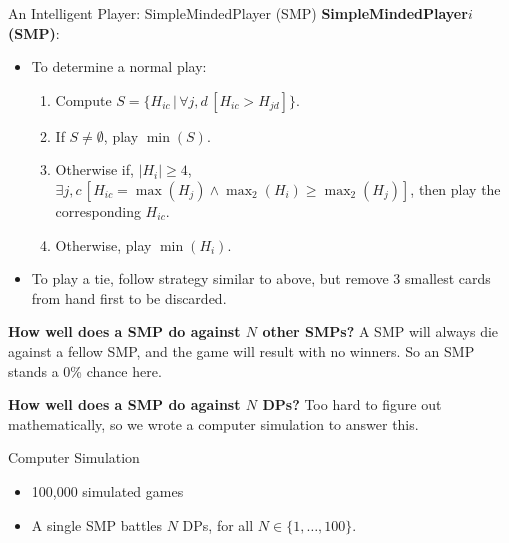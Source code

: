 \documentclass{slides}
\let\geq=\geqslant
\begin{document}
\begin{frame}{An Intelligent Player: SimpleMindedPlayer (SMP)}
    \textbf{SimpleMindedPlayer$i$ (SMP)}:
    \begin{itemize}
        \item To determine a normal play:
            \begin{enumerate}
                \item Compute $S = \{H_{ic} \,|\, \forall j,d\, [H_{ic} >
                    H_{jd}]\}$.
                \item If $S \ne \emptyset$, play $\min(S)$.
                \item Otherwise if, $|H_i| \geq 4$, $\exists j,c \,[H_{ic} =
                    \max\left(H_{j}\right) \land \max_2\left(H_{i}\right) \geq
                    \max_2\left(H_{j}\right)]$, then play the corresponding $H_{ic}$.
                \item Otherwise, play $\min\left(H_{i}\right)$.
            \end{enumerate}
        \item To play a tie, follow strategy similar to above, but remove 3
              smallest cards from hand first to be discarded.
    \end{itemize}
    \bigskip
    \pause

    \textbf{How well does a SMP do against $N$ other SMPs?} A SMP will always
    die against a fellow SMP, and the game will result with no winners. So an
    SMP stands a 0\% chance here.

    \bigskip
    \pause

    \textbf{How well does a SMP do against $N$ DPs?} Too hard to figure out
    mathematically, so we wrote a computer simulation to answer this.

\end{frame}


\begin{frame}{Computer Simulation}

    \begin{itemize}
        \item 100,000 simulated games
        \item A single SMP battles $N$ DPs, for all $N \in \{1, \ldots, 100\}$.
    \end{itemize}
\end{frame}
\end{document}
